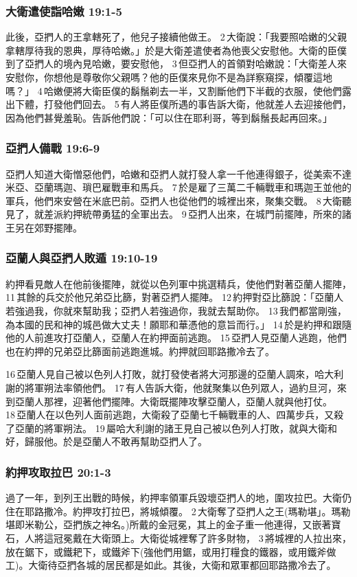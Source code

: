 \subsubsection{大衛遣使詣哈嫩 19:1-5}
此後，亞捫人的王拿轄死了，他兒子接續他做王。 2 大衛說：「我要照哈嫩的父親拿轄厚待我的恩典，厚待哈嫩。」於是大衛差遣使者為他喪父安慰他。大衛的臣僕到了亞捫人的境內見哈嫩，要安慰他， 3 但亞捫人的首領對哈嫩說：「大衛差人來安慰你，你想他是尊敬你父親嗎？他的臣僕來見你不是為詳察窺探，傾覆這地嗎？」 4 哈嫩便將大衛臣僕的鬍鬚剃去一半，又割斷他們下半截的衣服，使他們露出下體，打發他們回去。 5 有人將臣僕所遇的事告訴大衛，他就差人去迎接他們，因為他們甚覺羞恥。告訴他們說：「可以住在耶利哥，等到鬍鬚長起再回來。」


\subsubsection{亞捫人備戰 19:6-9}
亞捫人知道大衛憎惡他們，哈嫩和亞捫人就打發人拿一千他連得銀子，從美索不達米亞、亞蘭瑪迦、瑣巴雇戰車和馬兵。 7 於是雇了三萬二千輛戰車和瑪迦王並他的軍兵，他們來安營在米底巴前。亞捫人也從他們的城裡出來，聚集交戰。 8 大衛聽見了，就差派約押統帶勇猛的全軍出去。 9 亞捫人出來，在城門前擺陣，所來的諸王另在郊野擺陣。


\subsubsection{亞蘭人與亞捫人敗遁 19:10-19}
約押看見敵人在他前後擺陣，就從以色列軍中挑選精兵，使他們對著亞蘭人擺陣， 11 其餘的兵交於他兄弟亞比篩，對著亞捫人擺陣。 12 約押對亞比篩說：「亞蘭人若強過我，你就來幫助我；亞捫人若強過你，我就去幫助你。 13 我們都當剛強，為本國的民和神的城邑做大丈夫！願耶和華憑他的意旨而行。」 14 於是約押和跟隨他的人前進攻打亞蘭人，亞蘭人在約押面前逃跑。 15 亞捫人見亞蘭人逃跑，他們也在約押的兄弟亞比篩面前逃跑進城。約押就回耶路撒冷去了。

16 亞蘭人見自己被以色列人打敗，就打發使者將大河那邊的亞蘭人調來，哈大利謝的將軍朔法率領他們。 17 有人告訴大衛，他就聚集以色列眾人，過約旦河，來到亞蘭人那裡，迎著他們擺陣。大衛既擺陣攻擊亞蘭人，亞蘭人就與他打仗。 18 亞蘭人在以色列人面前逃跑，大衛殺了亞蘭七千輛戰車的人、四萬步兵，又殺了亞蘭的將軍朔法。 19 屬哈大利謝的諸王見自己被以色列人打敗，就與大衛和好，歸服他。於是亞蘭人不敢再幫助亞捫人了。

\subsubsection{約押攻取拉巴 20:1-3}
過了一年，到列王出戰的時候，約押率領軍兵毀壞亞捫人的地，圍攻拉巴。大衛仍住在耶路撒冷。約押攻打拉巴，將城傾覆。 2 大衛奪了亞捫人之王(瑪勒堪」。瑪勒堪即米勒公，亞捫族之神名。)所戴的金冠冕，其上的金子重一他連得，又嵌著寶石，人將這冠冕戴在大衛頭上。大衛從城裡奪了許多財物， 3 將城裡的人拉出來，放在鋸下，或鐵耙下，或鐵斧下(強他們用鋸，或用打糧食的鐵器，或用鐵斧做工)。大衛待亞捫各城的居民都是如此。其後，大衛和眾軍都回耶路撒冷去了。

